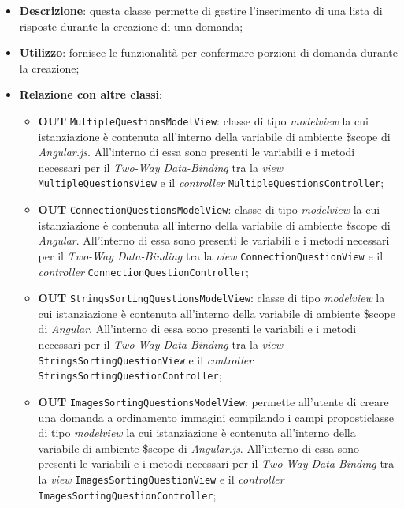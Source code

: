 \begin{itemize}
	\item \textbf{Descrizione}: questa classe permette di gestire l'inserimento di una lista di risposte durante la creazione di una domanda;
	\item \textbf{Utilizzo}: fornisce le funzionalità per confermare porzioni di domanda durante la creazione;
	\item \textbf{Relazione con altre classi}:
	\begin{itemize}
		\item \textbf{OUT} \texttt{MultipleQuestionsModelView}: classe di tipo \textit{modelview} la cui istanziazione è contenuta all'interno della variabile di ambiente \$scope di \textit{Angular.js}. All'interno di essa sono presenti le variabili e i metodi necessari per il \textit{Two-Way Data-Binding} tra la \textit{view} \texttt{MultipleQuestionsView} e il \textit{controller} \texttt{MultipleQuestionsController};
		\item \textbf{OUT} \texttt{ConnectionQuestionsModelView}: classe di tipo \textit{modelview} la cui istanziazione è contenuta all'interno della variabile di ambiente \$scope di \textit{Angular}. All'interno di essa sono presenti le variabili e i metodi necessari per il \textit{Two-Way Data-Binding} tra la \textit{view} \texttt{ConnectionQuestionView} e il \textit{controller} \texttt{ConnectionQuestionController};
		\item \textbf{OUT} \texttt{StringsSortingQuestionsModelView}: classe di tipo \textit{modelview} la cui istanziazione è contenuta all'interno della variabile di ambiente \$scope di \textit{Angular}. All'interno di essa sono presenti le variabili e i metodi necessari per il \textit{Two-Way Data-Binding} tra la \textit{view} \texttt{StringsSortingQuestionView} e il \textit{controller} \\ \texttt{StringsSortingQuestionController}; 
		\item \textbf{OUT} \texttt{ImagesSortingQuestionsModelView}: permette all'utente di creare una domanda a ordinamento immagini compilando i campi proposticlasse di tipo \textit{modelview} la cui istanziazione è contenuta all'interno della variabile di ambiente \$scope di \textit{Angular.js}. All'interno di essa sono presenti le variabili e i metodi necessari per il \textit{Two-Way Data-Binding} tra la \textit{view} \texttt{ImagesSortingQuestionView} e il \textit{controller} \\ \texttt{ImagesSortingQuestionController};

\end{itemize}
\end{itemize}
